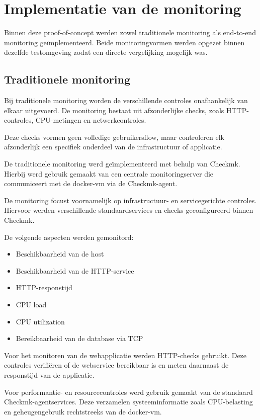 \section{Implementatie van de monitoring}

Binnen deze proof-of-concept werden zowel traditionele monitoring als end-to-end monitoring geïmplementeerd. Beide monitoringvormen werden opgezet binnen dezelfde testomgeving zodat een directe vergelijking mogelijk was.

\subsection{Traditionele monitoring}

Bij traditionele monitoring worden de verschillende controles onafhankelijk van elkaar uitgevoerd. De monitoring bestaat uit afzonderlijke checks, zoals HTTP-controles, CPU-metingen en netwerkcontroles.

Deze checks vormen geen volledige gebruikersflow, maar controleren elk afzonderlijk een specifiek onderdeel van de infrastructuur of applicatie.

De traditionele monitoring werd geïmplementeerd met behulp van Checkmk. Hierbij werd gebruik gemaakt van een centrale monitoringserver die communiceert met de docker-vm via de Checkmk-agent.

De monitoring focust voornamelijk op infrastructuur- en servicegerichte controles. Hiervoor werden verschillende standaardservices en checks geconfigureerd binnen Checkmk.

De volgende aspecten werden gemonitord:

\begin{itemize}
    \item Beschikbaarheid van de host
    \item Beschikbaarheid van de HTTP-service
    \item HTTP-responstijd
    \item CPU load
    \item CPU utilization
    \item Bereikbaarheid van de database via TCP
\end{itemize}

Voor het monitoren van de webapplicatie werden HTTP-checks gebruikt. Deze controles verifiëren of de webservice bereikbaar is en meten daarnaast de responstijd van de applicatie.

Voor performantie- en resourcecontroles werd gebruik gemaakt van de standaard Checkmk-agentservices. Deze verzamelen systeeminformatie zoals CPU-belasting en geheugengebruik rechtstreeks van de docker-vm.


